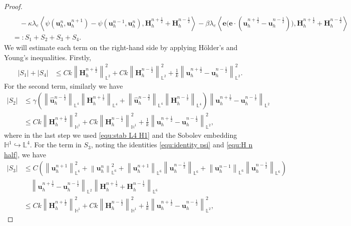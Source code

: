 \documentclass[11pt, reqno]{amsart}
\theoremstyle{definition}
\theoremstyle{remark}
\numberwithin{equation}{section}
\newcommand{\bff}{\boldsymbol}
\newcommand{\bb}{\mathbb}
\newcommand{\norm}[2]{\left\|{#1}\right\|_{#2}}
\newcommand{\inpro}[2]{\left\langle#1,#2\right\rangle}
\begin{document}
\begin{proof}
\begin{align*}
	\\
	&\quad 
	-
	\kappa \lambda_e \inpro{\psi(\bff{u}_h^n, \bff{u}_h^{n+1})-\psi(\bff{u}_h^{n-1},\bff{u}_h^n)}{\bff{H}_h^{n+\frac{1}{2}}+ \bff{H}_h^{n-\frac{1}{2}}}
	-
	\beta \lambda_e \inpro{\bff{e}\big(\bff{e}\cdot (\bff{u}_h^{n+\frac12}-\bff{u}_h^{n-\frac12})\big)}{\bff{H}_h^{n+\frac{1}{2}}+\bff{H}_h^{n-\frac{1}{2}}}
	\\
	&=: S_1 + S_2 + S_3+ S_4.
\end{align*}
We will estimate each term on the right-hand side by applying H\"older's and Young's inequalities. Firstly,
\begin{align}\label{equ:S1}
	|S_1| + |S_4|
	&\leq 
	Ck \norm{\bff{H}_h^{n+\frac{1}{2}}}{\bb{L}^2}^2 
	+ 
	Ck \norm{\bff{H}_h^{n-\frac{1}{2}}}{\bb{L}^2}^2
	+
	\frac{1}{k} \norm{\bff{u}_h^{n+\frac{1}{2}}- \bff{u}_h^{n-\frac{1}{2}}}{\bb{L}^2}^2.
\end{align}
For the second term, similarly we have
\begin{align}\label{equ:S2}
	\nonumber
	|S_2|
	&\leq
	\gamma \left( \norm{\widehat{\bff{u}}_h^{n-\frac{1}{2}}}{\bb{L}^4} \norm{\bff{H}_h^{n+\frac{1}{2}}}{\bb{L}^4}
	+
	\norm{\widehat{\bff{u}}_h^{n-\frac{3}{2}}}{\bb{L}^4} \norm{\bff{H}_h^{n-\frac{1}{2}}}{\bb{L}^4} \right)
	\norm{\bff{u}_h^{n+\frac{1}{2}}- \bff{u}_h^{n-\frac{1}{2}}}{\bb{L}^2}
	\\
	&\leq
	Ck \norm{\bff{H}_h^{n+\frac{1}{2}}}{\bb{H}^1}^2
	+
	Ck \norm{\bff{H}_h^{n-\frac{1}{2}}}{\bb{H}^1}^2
	+
	\frac{1}{k} \norm{\bff{u}_h^{n+\frac{1}{2}}- \bff{u}_h^{n-\frac{1}{2}}}{\bb{L}^2}^2,
\end{align}
where in the last step we used \eqref{equ:stab L4 H1} and the Sobolev embedding $\bb{H}^1 \hookrightarrow \bb{L}^4$. For the term in $S_3$, noting the identities \eqref{equ:identity psi} and \eqref{equ:H n half}, we have
\begin{align}\label{equ:S3}
	\nonumber
	|S_3|
	&\leq
	C \left( \norm{\bff{u}_h^{n+1}}{\bb{L}^6}^2 + \norm{\bff{u}_h^n}{\bb{L}^6}^2
	+ \norm{\bff{u}_h^{n+1}}{\bb{L}^6} \norm{\bff{u}_h^{n-\frac{1}{2}}}{\bb{L}^6}
	+ \norm{\bff{u}_h^{n-1}}{\bb{L}^6} \norm{\bff{u}_h^{n-\frac{1}{2}}}{\bb{L}^6} \right)
	\\
	\nonumber
	&\quad 
	\norm{\bff{u}_h^{n+\frac{1}{2}} - \bff{u}_h^{n-\frac{1}{2}}}{\bb{L}^2}
	\norm{\bff{H}_h^{n+\frac{1}{2}}+ \bff{H}_h^{n-\frac{1}{2}}}{\bb{L}^6}
	\\
	&\leq
	Ck \norm{\bff{H}_h^{n+\frac{1}{2}}}{\bb{H}^1}^2 
	+ 
	Ck \norm{\bff{H}_h^{n-\frac{1}{2}}}{\bb{H}^1}^2
	+
	\frac{1}{k} \norm{\bff{u}_h^{n+\frac{1}{2}}- \bff{u}_h^{n-\frac{1}{2}}}{\bb{L}^2}^2,

\end{align}
\end{proof}
\end{document}
